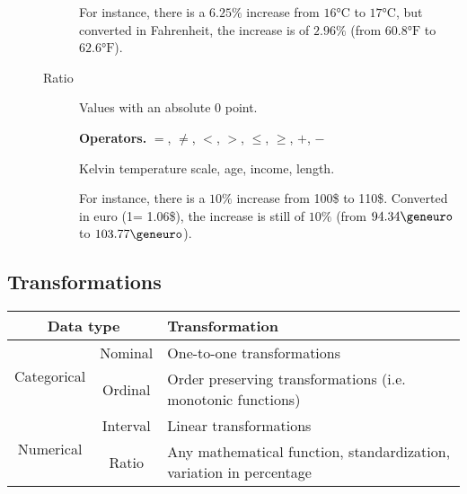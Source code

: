 \begin{description}
\begin{description}
\begin{example}
                    For instance, there is a $6.25\%$ increase from $16\text{°C}$ to $17\text{°C}$, but
                    converted in Fahrenheit, the increase is of $2.96\%$ (from $60.8\text{°F}$ to $62.6\text{°F}$).
                \end{example}

            \item[Ratio] 
                Values with an absolute 0 point.

                \textbf{Operators.} $=$, $\neq$, $<$, $>$, $\leq$, $\geq$, $+$, $-$
                \begin{example}
                    Kelvin temperature scale, age, income, length.

                    For instance, there is a $10\%$ increase from 100\$ to 110\$.
                    Converted in euro (1\geneuro = 1.06\$), the increase is still of $10\%$ (from $94.34\geneuro$ to $103.77\geneuro$).
                \end{example}
        \end{description}
\end{description}


\subsection{Transformations}
\begin{center}
    
    \begin{tabular}{c|c|>{\raggedright\arraybackslash}m{8cm}}
        \hline
        \multicolumn{2}{c|}{\textbf{Data type}} & \textbf{Transformation} \\
        \hline
        \multirow{2}{*}{Categorical}    & Nominal  & One-to-one transformations \\
        \cline{2-3}
                                        & Ordinal  & Order preserving transformations (i.e. monotonic functions) \\
        \hline
        \multirow{2}{*}{Numerical}      & Interval & Linear transformations \\
        \cline{2-3}
                                        & Ratio    & Any mathematical function, standardization, variation in percentage \\
        \hline
    \end{tabular}
\end{center}





